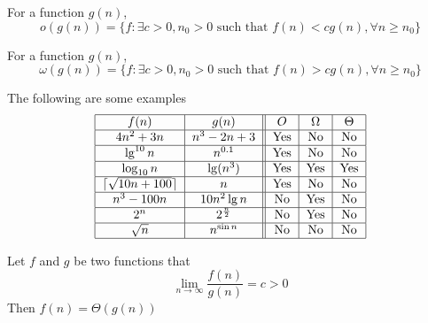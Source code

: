 				\begin{definition}[$o$-Notation]
					For a function $g(n)$, 
					\begin{equation*}
						o(g(n)) = \{f: \exists c > 0, n_0 > 0 \text{ such that } f(n) < cg(n), \forall n\ge n_0\}
					\end{equation*}					
				\end{definition}

				\begin{definition}
					For a function $g(n)$, 
					\begin{equation*}
						\omega(g(n)) = \{f: \exists c > 0, n_0 > 0 \text{ such that } f(n) > cg(n), \forall n\ge n_0\}
					\end{equation*}					
				\end{definition}


				\begin{example}
					The following are some examples
					\begin{align}
						\centering
						\begin{tabular}{|c|c||c|c|c|}
							\hline
							$f(n)$ & $g(n)$ & $O$ & $\Omega$ & $\Theta$\\
							\hline
							$4n^2 + 3n$ & $n^3 - 2n + 3$ & Yes & No & No \\
							\hline
							$\lg^{10} n$ & $n^{0.1}$ & Yes & No & No \\
							\hline
							$\log_{10} n$ & $\lg(n^3)$ & Yes & Yes & Yes \\
							\hline
							$\lceil \sqrt{10n + 100} \rceil$ & $n$ & Yes & No & No \\
							\hline
							$n^3 -100n$ & $10n^2\lg n$ & No & Yes & No\\
							\hline
							$2^n$ & $2^{\frac n2}$ & No & Yes & No \\
							\hline
							$\sqrt{n}$ & $n^{\sin n}$ & No & No & No\\
							\hline
						\end{tabular}
					\end{align}
				\end{example}

				\begin{theorem}
					Let $f$ and $g$ be two functions that
					\begin{equation*}
						\lim_{n\rightarrow \infty} \frac{f(n)}{g(n)} = c > 0
					\end{equation*}
					Then $f(n) = \Theta(g(n))$
				\end{theorem}

